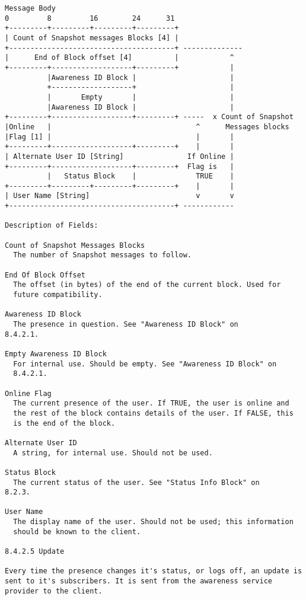 \documentclass[titlepage,oneside]{book}
\begin{document}
\begin{verbatim}
Message Body
0         8         16        24      31
+---------+---------+---------+---------+
| Count of Snapshot messages Blocks [4] |
+---------------------------------------+ --------------
|      End of Block offset [4]          |            ^
+---------+-------------------+---------+            |
          |Awareness ID Block |                      |
          +-------------------+                      |
          |       Empty       |                      |
          |Awareness ID Block |                      |
+---------+-------------------+---------+ -----  x Count of Snapshot
|Online   |                                  ^      Messages blocks
|Flag [1] |                                  |       |
+---------+-------------------+---------+    |       |
| Alternate User ID [String]               If Online |
+---------+-------------------+---------+  Flag is   |
          |   Status Block    |              TRUE    |
+---------+---------+---------+---------+    |       |
| User Name [String]                         v       v
+---------------------------------------+ ------------

Description of Fields:

Count of Snapshot Messages Blocks
  The number of Snapshot messages to follow.

End Of Block Offset
  The offset (in bytes) of the end of the current block. Used for
  future compatibility.

Awareness ID Block
  The presence in question. See "Awareness ID Block" on
8.4.2.1.

Empty Awareness ID Block
  For internal use. Should be empty. See "Awareness ID Block" on
  8.4.2.1.

Online Flag
  The current presence of the user. If TRUE, the user is online and
  the rest of the block contains details of the user. If FALSE, this
  is the end of the block.

Alternate User ID
  A string, for internal use. Should not be used.

Status Block
  The current status of the user. See "Status Info Block" on
8.2.3.

User Name
  The display name of the user. Should not be used; this information
  should be known to the client.

8.4.2.5 Update

Every time the presence changes it's status, or logs off, an update is
sent to it's subscribers. It is sent from the awareness service
provider to the client.


\end{verbatim}
\end{document}
